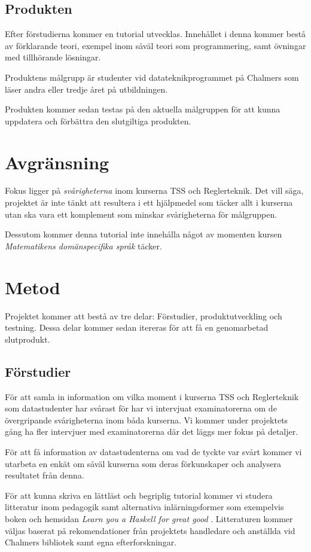 \documentclass{article}
\begin{document}
\subsection{Produkten}
Efter förstudierna kommer en tutorial utvecklas.
Innehållet i denna kommer bestå av förklarande
teori, exempel inom såväl teori som programmering,
samt övningar med tillhörande lösningar.

Produktens målgrupp är studenter vid datateknikprogrammet på
Chalmers som läser andra eller tredje året på utbildningen.

Produkten kommer sedan testas på den aktuella målgruppen för att kunna
uppdatera och förbättra den slutgiltiga produkten.

\section{Avgränsning}
Fokus ligger på \emph{svårigheterna} inom kurserna
TSS och Reglerteknik. Det vill säga, projektet är inte tänkt
att resultera i ett hjälpmedel som täcker allt i kurserna
utan ska vara ett komplement som minskar svårigheterna för målgruppen.

Dessutom kommer denna tutorial inte innehålla något av momenten kursen \textit{Matematikens domänspecifika språk} täcker.

\newpage
\section{Metod}
Projektet kommer att bestå av tre delar: Förstudier,
produktutveckling och testning. Dessa delar kommer
sedan itereras för att få en genomarbetad slutprodukt.

\subsection{Förstudier}
För att samla in information om vilka moment i kurserna
TSS och Reglerteknik som datastudenter har svårast för har
vi intervjuat examinatorerna om de övergripande
svårigheterna inom båda kurserna.
Vi kommer under projektets gång ha fler intervjuer med
examinatorerna där det läggs mer fokus på detaljer.

För att få information av datastudenterna om vad de tyckte
var svårt kommer vi utarbeta en enkät om såväl kurserna
som deras förkunskaper och analysera resultatet från denna.

För att kunna skriva en lättläst och begriplig tutorial
kommer vi studera litteratur inom pedagogik samt
alternativa inlärningsformer som exempelvis boken och
hemsidan \textit{Learn you a Haskell for great good} \cite{learnyouahaskell}.
Litteraturen kommer väljas baserat på rekomendationer från
projektets handledare och anställda vid Chalmers bibliotek
samt egna efterforskningar.
\end{document}
